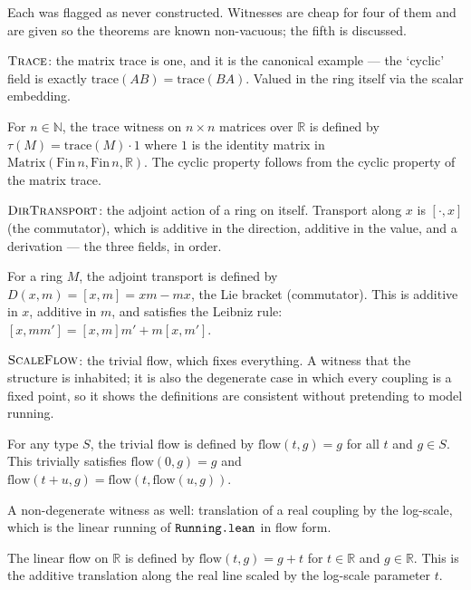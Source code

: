 Each was flagged as never constructed.  Witnesses are cheap for four of them
and are given so the theorems are known non-vacuous; the fifth is discussed.

\begin{definition}
\label{def:matrixTrace}
$\text{\textsc{Trace}}$: the matrix trace is one, and it is the canonical example — the
`cyclic' field is exactly $\text{trace}(AB) = \text{trace}(BA)$.
Valued in the ring itself via the scalar embedding. 

For $n \in \mathbb{N}$, the trace witness on $n \times n$ matrices over $\mathbb{R}$ is
defined by $\tau(M) = \text{trace}(M) \cdot 1$ where $1$ is the identity matrix in
$\text{Matrix}(\text{Fin} \, n, \text{Fin} \, n, \mathbb{R})$. The cyclic property follows
from the cyclic property of the matrix trace.
\end{definition}

\begin{definition}
\label{def:adTransport}
$\text{\textsc{DirTransport}}$: the adjoint action of a ring on itself.  Transport along
$x$ is $[\cdot, x]$ (the commutator), which is additive in the direction, additive in the value, and
a derivation — the three fields, in order. 

For a ring $M$, the adjoint transport is defined by $D(x, m) = [x, m] = xm - mx$,
the Lie bracket (commutator). This is additive in $x$, additive in $m$, and satisfies
the Leibniz rule: $[x, mm'] = [x,m]m' + m[x,m']$.
\end{definition}

\begin{definition}
\label{def:trivialFlow}
$\text{\textsc{ScaleFlow}}$: the trivial flow, which fixes everything.  A witness that
the structure is inhabited; it is also the degenerate case in which every
coupling is a fixed point, so it shows the definitions are consistent without
pretending to model running. 

For any type $S$, the trivial flow is defined by $\text{flow}(t, g) = g$ for all $t$
and $g \in S$. This trivially satisfies $\text{flow}(0, g) = g$ and
$\text{flow}(t + u, g) = \text{flow}(t, \text{flow}(u, g))$.
\end{definition}

\begin{definition}
\label{def:linearFlow}
A non-degenerate witness as well: translation of a real coupling by the
log-scale, which is the linear running of $\text{\texttt{Running.lean}}$ in flow form.

The linear flow on $\mathbb{R}$ is defined by $\text{flow}(t, g) = g + t$ for $t \in \mathbb{R}$
and $g \in \mathbb{R}$. This is the additive translation along the real line scaled by the
log-scale parameter $t$.
\end{definition}

